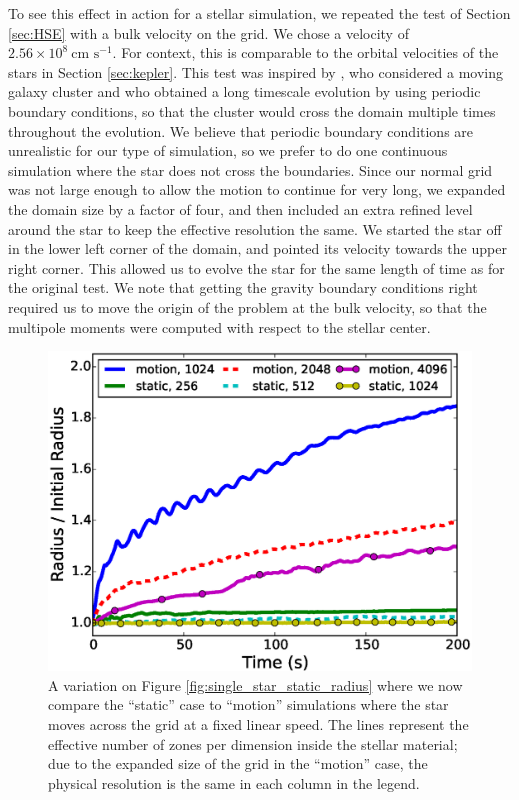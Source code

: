 \documentclass[iop]{emulateapj}
\begin{document}
To see this effect in action for a stellar simulation, we repeated the test of Section 
\ref{sec:HSE} with a bulk velocity on the grid. We chose a velocity of $2.56 \times 10^{8}\ \text{cm s}^{-1}$.
For context, this is comparable to the orbital velocities of the stars in Section \ref{sec:kepler}.
This test was inspired by \citet{tasker:2008}, who considered a moving galaxy cluster 
and who obtained a long timescale evolution by using periodic boundary conditions, 
so that the cluster would cross the domain multiple times throughout the evolution.
We believe that periodic boundary conditions are unrealistic for our type of simulation,
so we prefer to do one continuous simulation where the star does not cross the boundaries.
Since our normal grid was not large enough to allow the motion to continue for very long, we expanded 
the domain size by a factor of four, and then included an extra refined level around the star to 
keep the effective resolution the same. We started the star off in the lower left corner of the domain, and 
pointed its velocity towards the upper right corner. This allowed us to evolve the star for the 
same length of time as for the original test. We note that getting the gravity boundary conditions right 
required us to move the origin of the problem at the bulk velocity, so that the multipole moments 
were computed with respect to the stellar center.

\begin{figure}
  \centering
  \includegraphics[scale=0.45]{plots/single_star_compare_1e3_radius}
  \caption{A variation on Figure \ref{fig:single_star_static_radius} where
    we now compare the ``static'' case to ``motion'' simulations where the 
    star moves across the grid at a fixed linear speed. The lines represent 
    the effective number of zones per dimension inside the stellar material;
    due to the expanded size of the grid in the ``motion'' case, the 
    physical resolution is the same in each column in the legend.
    \label{fig:single_star_compare_radius}}
\end{figure}
\end{document}
